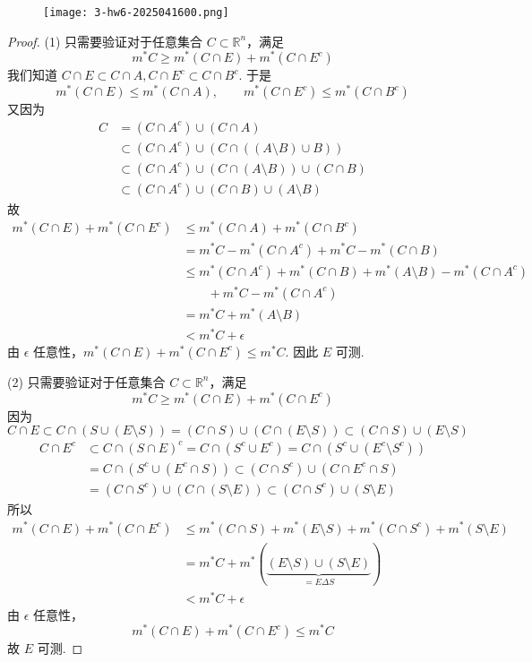 \begin{exercise}
\begin{figure}[H]
\centering
\texttt{[image: 3-hw6-2025041600.png]}
\label{}
\end{figure}\label{5c15b8}
\end{exercise}

\begin{proof}
(1) 只需要验证对于任意集合 $C\subset \mathbb{R}^{n}$，满足
\[
m^{*}C\geq m^{*}(C\cap E)+m^{*}(C\cap E^{c})
\]
我们知道 $C\cap E\subset C\cap A,C\cap E^{c}\subset C\cap B^{c}$. 于是
\[
m^{*}(C\cap E)\leq m^{*}(C\cap A),\qquad m^{*}(C\cap E^{c})\leq m^{*}(C\cap B^{c})
\]
又因为
\[
\begin{aligned}
C & =(C\cap A^{c})\cup(C\cap A) \\
 & \subset(C\cap A^{c})\cup(C\cap((A\setminus B)\cup B)) \\
 & \subset(C\cap A^{c})\cup(C\cap(A\setminus B))\cup(C\cap B) \\
 & \subset(C\cap A^{c})\cup(C\cap B)\cup(A\setminus B)
\end{aligned}
\]
故
\[
\begin{aligned}
m^{*}(C\cap E)+m^{*}(C\cap E^{c}) & \leq m^{*}(C\cap A)+m^{*}(C\cap B^{c}) \\
 & =m^{*}C-m^{*}(C\cap A^{c})+m^{*}C-m^{*}(C\cap B) \\
 & \leq m^{*}(C\cap A^{c})+m^{*}(C\cap B)+m^{*}(A\setminus B)-m^{*}(C\cap A^{c}) \\
 &\qquad +m^{*}C-m^{*}(C\cap A^{c}) \\
 & =m^{*}C+m^{*}(A\setminus B) \\
 & <m^{*}C+\epsilon
\end{aligned}
\]
由 $\epsilon$ 任意性，$m^{*}(C\cap E)+m^{*}(C\cap E^{c})\leq m^{*}C$. 因此 $E$ 可测.

(2) 只需要验证对于任意集合 $C\subset \mathbb{R}^{n}$，满足
\[
m^{*}C\geq m^{*}(C\cap E)+m^{*}(C\cap E^{c})
\]
因为
\[
C\cap E\subset C\cap(S\cup(E\setminus S))=(C\cap S)\cup(C\cap(E\setminus S))\subset(C\cap S)\cup(E\setminus S)
\]
\[
\begin{aligned}
C\cap E^{c} & \subset C\cap(S\cap E)^{c}=C\cap(S^{c}\cup E^{c})=C\cap(S^{c}\cup(E^{c}\setminus S^{c})) \\
 & =C\cap(S^{c}\cup(E^{c}\cap S)) \subset (C\cap S^{c})\cup(C\cap E^{c}\cap S) \\
 & =(C\cap S^{c})\cup(C\cap(S\setminus E))\subset(C\cap S^{c})\cup(S\setminus E)
\end{aligned}
\]
所以
\[
\begin{aligned}
m^{*}(C\cap E)+m^{*}(C\cap E^{c}) & \leq m^{*}(C\cap S)+m^{*}(E\setminus S)+m^{*}(C\cap S^{c})+m^{*}(S\setminus E) \\
 & =m^{*}C+m^{*}(\underbrace{ (E\setminus S)\cup(S\setminus E) }_{ =E\Delta S }) \\
 & <m^{*}C+\epsilon
\end{aligned}
\]
由 $\epsilon$ 任意性，
\[
m^{*}(C\cap E)+m^{*}(C\cap E^{c})\leq m^{*}C
\]
故 $E$ 可测.


\end{proof}
